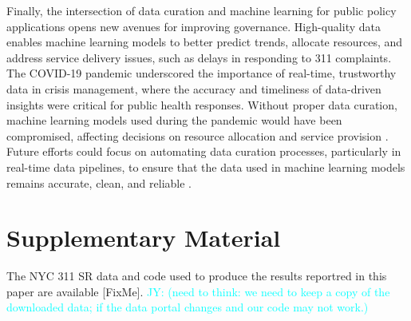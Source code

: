 \documentclass[linenumber]{jdsart}
\newcommand{\jy}[1]{\textcolor{cyan}{JY: (#1)}}
\begin{document}
Finally, the intersection of data curation and machine learning for
public policy applications opens new avenues for improving governance.
High-quality data enables machine learning models to better predict
trends, allocate resources, and address service delivery issues, such
as delays in responding to 311 complaints. The COVID-19 pandemic
underscored the importance of real-time, trustworthy data in crisis
management, where the accuracy and timeliness of data-driven insights
were critical for public health responses. Without proper data
curation, machine learning models used during the pandemic would have
been compromised, affecting decisions on resource allocation and
service provision \citep{worby2020face, khemasuwan2021applications}.
Future efforts could focus on automating data curation processes,
particularly in real-time data pipelines, to ensure that the data used
in machine learning models remains accurate, clean, and reliable
\citep{chu2016data, hurbean2021open}.


\section*{Supplementary Material}
The NYC 311 SR data and code used to produce the results reportred in
this paper are available [FixMe].
\jy{need to think: we need to keep a copy of the downloaded data;
  if the data portal changes and our code may not work.}





\end{document}
